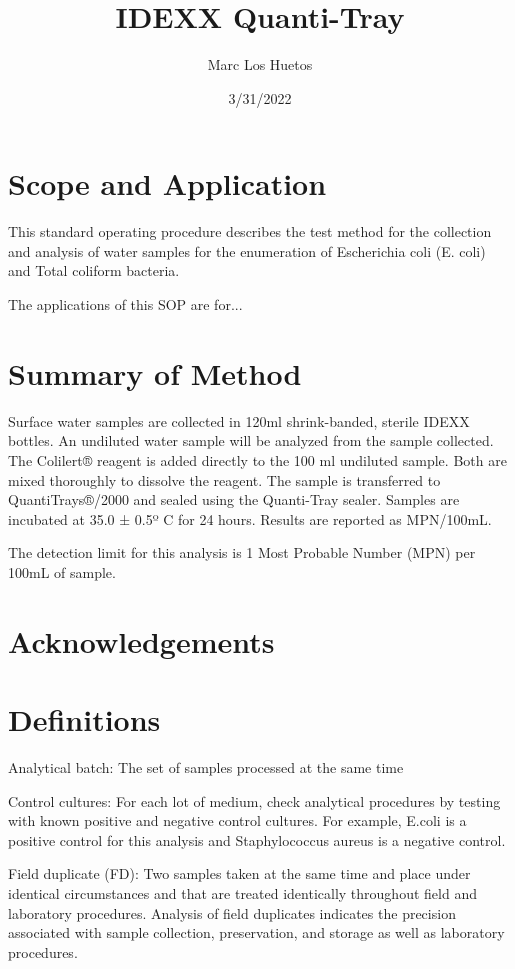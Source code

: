 \documentclass[12pt]{../SOP4_alpha}\usepackage[]{graphicx}\usepackage[]{color}
\title{IDEXX Quanti-Tray}
\date{3/31/2022}
\author{Marc Los Huetos}
\begin{document}
\maketitle

\section{Scope and Application}

\NP This standard operating procedure describes the test method for the collection and analysis of water samples for the enumeration of Escherichia coli (E. coli) and
Total coliform bacteria.

\NP The applications of this SOP are for...

\section{Summary of Method}

\NP Surface water samples are collected in 120ml shrink-banded, sterile IDEXX bottles. An undiluted water sample will be analyzed from the sample collected.
The Colilert® reagent is added directly to the 100 ml undiluted sample. Both are mixed thoroughly to dissolve the reagent. The sample is transferred to QuantiTrays®/2000 and sealed using the Quanti-Tray sealer. Samples are incubated at 35.0 ± 0.5º C for 24 hours. Results are reported as MPN/100mL. 

\NP The detection limit for this analysis is 1 Most Probable Number (MPN) per 100mL of sample. 

\tableofcontents

\newpage

\section{Acknowledgements}

\section{Definitions}

\NP Analytical batch: The set of samples processed at the same time

\NP Control cultures: For each lot of medium, check analytical procedures by
testing with known positive and negative control cultures. For example,
E.coli is a positive control for this analysis and Staphylococcus aureus is a
negative control.

\NP Field duplicate (FD): Two samples taken at the same time and place under
identical circumstances and that are treated identically throughout field
and laboratory procedures. Analysis of field duplicates indicates the
precision associated with sample collection, preservation, and storage as
well as laboratory procedures.
\end{document}
